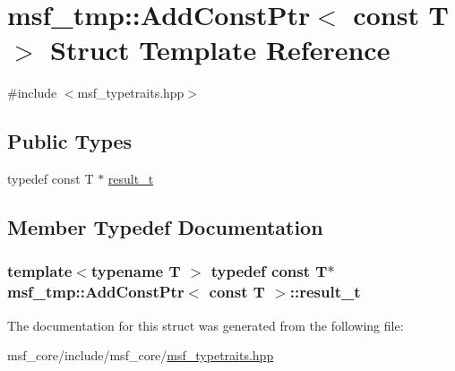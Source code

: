 \hypertarget{structmsf__tmp_1_1AddConstPtr_3_01const_01T_01_4}{\section{msf\-\_\-tmp\-:\-:Add\-Const\-Ptr$<$ const T $>$ Struct Template Reference}
\label{structmsf__tmp_1_1AddConstPtr_3_01const_01T_01_4}
}


{\ttfamily \#include $<$msf\-\_\-typetraits.\-hpp$>$}

\subsection*{Public Types}
\begin{DoxyCompactItemize}
\item 
typedef const T $\ast$ \hyperlink{structmsf__tmp_1_1AddConstPtr_3_01const_01T_01_4_a14f5af4d2170d8a56f46e7e6447248fa}{result\-\_\-t}
\end{DoxyCompactItemize}


\subsection{Member Typedef Documentation}
\hypertarget{structmsf__tmp_1_1AddConstPtr_3_01const_01T_01_4_a14f5af4d2170d8a56f46e7e6447248fa}{
\subsubsection[{result\-\_\-t}]{\setlength{\rightskip}{0pt plus 5cm}template$<$typename T $>$ typedef const T$\ast$ {\bf msf\-\_\-tmp\-::\-Add\-Const\-Ptr}$<$ const T $>$\-::{\bf result\-\_\-t}}}\label{structmsf__tmp_1_1AddConstPtr_3_01const_01T_01_4_a14f5af4d2170d8a56f46e7e6447248fa}


The documentation for this struct was generated from the following file\-:\begin{DoxyCompactItemize}
\item 
msf\-\_\-core/include/msf\-\_\-core/\hyperlink{msf__typetraits_8hpp}{msf\-\_\-typetraits.\-hpp}\end{DoxyCompactItemize}
